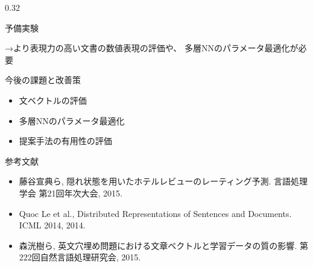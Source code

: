 \documentclass[8pt,unicode]{beamer}
\newcommand{\columnscale}{0.32}
\newcommand{\arrow}{{\color{ttiblue} →}\hspace{1ex}}
\begin{document}
\begin{frame}{}
\begin{columns}[t]
\begin{column}{\columnscale\textwidth}
\begin{block}{予備実験}
\begin{itemize}
        \arrow より表現力の高い文書の数値表現の評価や、
        多層NNのパラメータ最適化が必要
    \end{itemize}
  \end{block} %

  \begin{block}{今後の課題と改善策}
    \begin{itemize}
      \item 文ベクトルの評価
      \item 多層NNのパラメータ最適化
      \item 提案手法の有用性の評価
    \end{itemize}
  \end{block} %

  参考文献 \\
  \begin{itemize}
  \item 藤谷宣典ら, 隠れ状態を用いたホテルレビューのレーティング予測.
  言語処理学会 第21回年次大会, 2015. \\
  \item Quoc Le et al., Distributed Representations of Sentences and Documents.
  ICML 2014, 2014. \\
  \item 森洸樹ら, 英文穴埋め問題における文章ベクトルと学習データの質の影響.
  第222回自然言語処理研究会, 2015.
  \end{itemize}
\end{column} %

\end{columns}
\end{frame}
\end{document}
